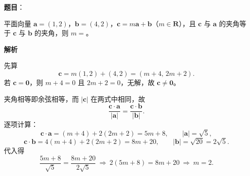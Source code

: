 \begin{answer}

\textbf{题目}：

平面向量 $\boldsymbol a=(1,2)$，$\boldsymbol b=(4,2)$，$\boldsymbol c=m\boldsymbol a+\boldsymbol b$（$m\in\mathbf R$），且 $\boldsymbol c$ 与 $\boldsymbol a$ 的夹角等于 $\boldsymbol c$ 与 $\boldsymbol b$ 的夹角，则 $m=$\gkblank{}。

\textbf{解析}

先算
\nopagebreak[4]
\[\boldsymbol c=m(1,2)+(4,2)=(m+4,\,2m+2).\]
若 $\boldsymbol c=\boldsymbol 0$，则 $m+4=0$ 且 $2m+2=0$，无解，故 $\boldsymbol c\neq\boldsymbol 0$。

夹角相等即余弦相等，而 $|\boldsymbol c|$ 在两式中相同，故
\nopagebreak[4]
\[\frac{\boldsymbol c\cdot\boldsymbol a}{|\boldsymbol a|}=\frac{\boldsymbol c\cdot\boldsymbol b}{|\boldsymbol b|} .\]
逐项计算：
\nopagebreak[4]
\[\boldsymbol c\cdot\boldsymbol a=(m+4)+2(2m+2)=5m+8,\qquad |\boldsymbol a|=\sqrt5,\]
\nopagebreak[4]
\[\boldsymbol c\cdot\boldsymbol b=4(m+4)+2(2m+2)=8m+20,\qquad |\boldsymbol b|=\sqrt{20}=2\sqrt5 .\]
代入得
\nopagebreak[4]
\[\frac{5m+8}{\sqrt5}=\frac{8m+20}{2\sqrt5}
\ \Longrightarrow\ 2(5m+8)=8m+20
\ \Longrightarrow\ m=2 .\]


\end{answer}
